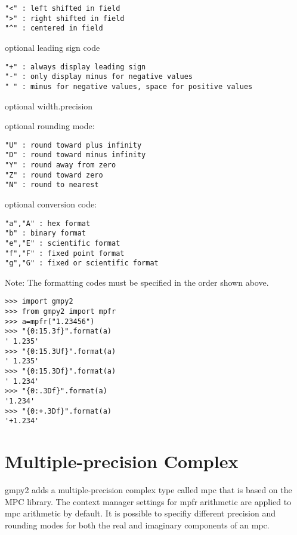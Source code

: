 \begin{lstlisting}
"<" : left shifted in field
">" : right shifted in field
"^" : centered in field
\end{lstlisting}

optional leading sign code
\begin{lstlisting}
"+" : always display leading sign
"-" : only display minus for negative values
" " : minus for negative values, space for positive values
\end{lstlisting}

optional width.precision

optional rounding mode:
\begin{lstlisting}
"U" : round toward plus infinity
"D" : round toward minus infinity
"Y" : round away from zero
"Z" : round toward zero
"N" : round to nearest
\end{lstlisting}


optional conversion code:
\begin{lstlisting}
"a","A" : hex format
"b" : binary format
"e","E" : scientific format
"f","F" : fixed point format
"g","G" : fixed or scientific format
\end{lstlisting}

Note: The formatting codes must be specified in the order shown above.

\begin{lstlisting}
>>> import gmpy2
>>> from gmpy2 import mpfr
>>> a=mpfr("1.23456")
>>> "{0:15.3f}".format(a)
' 1.235'
>>> "{0:15.3Uf}".format(a)
' 1.235'
>>> "{0:15.3Df}".format(a)
' 1.234'
>>> "{0:.3Df}".format(a)
'1.234'
>>> "{0:+.3Df}".format(a)
'+1.234'
\end{lstlisting}




\newpage
\section{Multiple-precision Complex}

gmpy2 adds a multiple-precision complex type called mpc that is based on the MPC library.
The context manager settings for mpfr arithmetic are applied to mpc arithmetic by default. It is possible to specifiy different precision and rounding modes for both the real and
imaginary components of an mpc.

